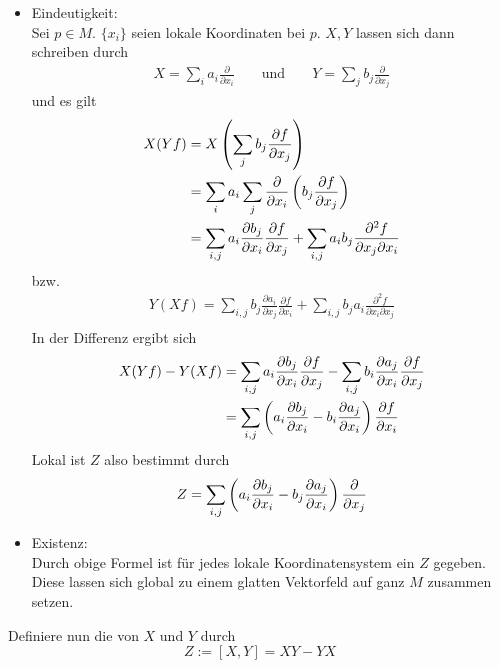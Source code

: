 \begin{Beweis}{}
\begin{itemize}
	\item Eindeutigkeit:\\
	Sei $p \in M$. $\{x_i\}$ seien lokale Koordinaten bei $p$. $X, Y$ lassen sich dann schreiben durch
	\begin{align*}
	X = \sum_i a_i \frac{\partial}{\partial x_i} && \text{ und } && Y = \sum_j b_j \frac{\partial}{\partial x_j}
	\end{align*}
	und es gilt
	\begin{align*}
	X(Yf) &= X\left(\sum_j b_j \frac{\partial f}{\partial x_j}\right)\\
	&= \sum_i a_i \sum_j \frac{\partial }{\partial x_i} \left(b_j \frac{\partial f}{\partial x_j}\right)\\
	&= \sum_{i,j} a_i \frac{\partial b_j}{\partial x_i} \frac{\partial f}{\partial x_j} + 
	\sum_{i,j} a_i b_j \frac{\partial^2 f}{\partial x_j\partial x_i} 
	\end{align*}
	bzw.
	\begin{align*}
		Y(Xf) =  \sum_{i,j} b_j \frac{\partial a_i}{\partial x_j} \frac{\partial f}{\partial x_i} + 
	\sum_{i,j} b_j a_i \frac{\partial^2 f}{\partial x_i\partial x_j} \\
	\end{align*}
	In der Differenz ergibt sich
	\begin{align*}
	X(Yf) - Y(Xf) &= \sum_{i,j} a_i \frac{\partial b_j}{\partial x_i} \frac{\partial f}{\partial x_j}
	- \sum_{i,j} b_i \frac{\partial a_j}{\partial x_i} \frac{\partial f}{\partial x_j}\\
	&= \sum_{i,j} \left(a_i \frac{\partial b_j}{\partial x_i} - b_i \frac{\partial a_j}{\partial x_i} \right) \frac{\partial f}{\partial x_i}
	\end{align*}
	Lokal ist $Z$ also bestimmt durch
	\[ Z =  \sum_{i,j} \left(a_i \frac{\partial b_j}{\partial x_i} - b_j \frac{\partial a_j}{\partial x_i} \right) \frac{\partial }{\partial x_j} \]
	\item Existenz:\\
	Durch obige Formel ist für jedes lokale Koordinatensystem ein $Z$ gegeben. Diese lassen sich global zu einem glatten Vektorfeld auf ganz $M$ zusammen setzen.
\end{itemize}
\end{Beweis}

\Def{}
Definiere nun die  von $X$ und $Y$ durch
\[ Z:= [X,Y] = XY - YX\]

